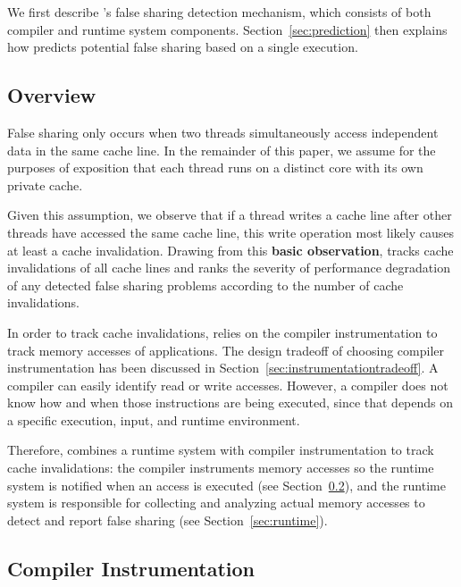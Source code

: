 \label{sec:detection}

We first describe \Predator{}'s false sharing detection mechanism, which consists of both compiler and runtime system
components. Section~\ref{sec:prediction} then explains how \Predator{} predicts potential false sharing based on a single execution.

\subsection{Overview}
\label{sec:overview}
False sharing only occurs when two threads
simultaneously access independent data in the same cache line.
In the remainder of this paper, we assume for the purposes of exposition that each thread runs on a 
distinct core with its own private cache.

Given this assumption, we observe that 
if a thread writes a cache line after other threads have 
accessed the same cache line, this write operation most likely causes at least a cache invalidation. Drawing from this \textbf{basic observation}, \Predator{} tracks cache invalidations of all cache lines and ranks the severity of performance degradation of any detected false sharing problems according to the number of cache invalidations. 
 
In order to track cache invalidations, \Predator{} relies on the compiler instrumentation to track memory accesses of applications. The design tradeoff of choosing compiler instrumentation has been discussed in Section~\ref{sec:instrumentationtradeoff}. A compiler can easily identify read or write accesses. However, a compiler does not know how and when those instructions are being executed, since that depends on a specific execution, input, and runtime environment.

Therefore, \Predator{} combines a runtime system with compiler
instrumentation to track cache invalidations: the compiler
instruments memory accesses so the runtime system is notified when an access is executed (see Section~\ref{sec:compiler}), and the runtime system is responsible for collecting and analyzing actual memory accesses to detect and report false sharing (see Section~\ref{sec:runtime}).

\subsection{Compiler Instrumentation}
\label{sec:compiler}

